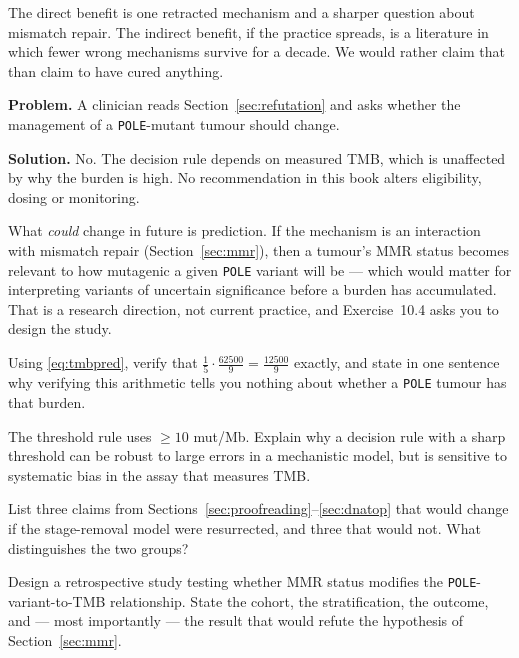 The direct benefit is one retracted mechanism and a sharper question about
mismatch repair. The indirect benefit, if the practice spreads, is a literature
in which fewer wrong mechanisms survive for a decade. We would rather claim that
than claim to have cured anything.

\begin{worked}
\textbf{Problem.} A clinician reads Section~\ref{sec:refutation} and asks whether
the management of a \texttt{POLE}-mutant tumour should change.

\textbf{Solution.} No. The decision rule depends on measured TMB, which is
unaffected by why the burden is high. No recommendation in this book alters
eligibility, dosing or monitoring.

What \emph{could} change in future is prediction. If the mechanism is an
interaction with mismatch repair (Section~\ref{sec:mmr}), then a tumour's MMR
status becomes relevant to how mutagenic a given \texttt{POLE} variant will be ---
which would matter for interpreting variants of uncertain significance before a
burden has accumulated. That is a research direction, not current practice, and
Exercise~10.4 asks you to design the study.
\end{worked}

\begin{exercise}
Using \eqref{eq:tmbpred}, verify that $\frac{1}{5}\cdot\frac{62500}{9} =
\frac{12500}{9}$ exactly, and state in one sentence why verifying this arithmetic
tells you nothing about whether a \texttt{POLE} tumour has that burden.
\end{exercise}

\begin{exercise}
The threshold rule uses $\ge 10$ mut/Mb. Explain why a decision rule with a sharp
threshold can be robust to large errors in a mechanistic model, but is sensitive
to systematic bias in the assay that measures TMB.
\end{exercise}

\begin{exercise}
List three claims from Sections~\ref{sec:proofreading}--\ref{sec:dnatop} that
would change if the stage-removal model were resurrected, and three that would
not. What distinguishes the two groups?
\end{exercise}

\begin{exercise}[(harder)]
Design a retrospective study testing whether MMR status modifies the
\texttt{POLE}-variant-to-TMB relationship. State the cohort, the stratification,
the outcome, and --- most importantly --- the result that would refute the
hypothesis of Section~\ref{sec:mmr}.
\end{exercise}

